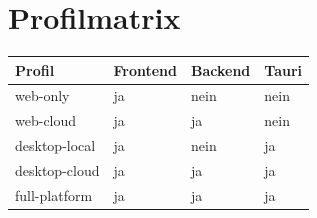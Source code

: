 \section{Profilmatrix}
\label{app:profile-matrix}

\begin{tabularx}{\textwidth}{@{}lXXX@{}}
\toprule
Profil & Frontend & Backend & Tauri \\
\midrule
web-only & ja & nein & nein \\
web-cloud & ja & ja & nein \\
desktop-local & ja & nein & ja \\
desktop-cloud & ja & ja & ja \\
full-platform & ja & ja & ja \\
\bottomrule
\end{tabularx}
